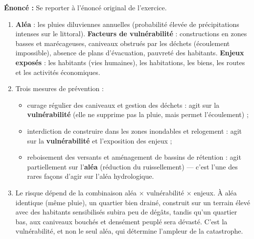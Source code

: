 \documentclass[11pt]{article}
\begin{document}
\begin{corrige}
\textbf{Énoncé :} Se reporter à l'énoncé original de l'exercice.
\tcblower
\begin{enumerate}
\item \textbf{Aléa} : les pluies diluviennes annuelles (probabilité élevée de précipitations intenses sur le littoral). \textbf{Facteurs de vulnérabilité} : constructions en zones basses et marécageuses, caniveaux obstrués par les déchets (écoulement impossible), absence de plans d'évacuation, pauvreté des habitants. \textbf{Enjeux exposés} : les habitants (vies humaines), les habitations, les biens, les routes et les activités économiques.
\item Trois mesures de prévention :
\begin{itemize}
\item curage régulier des caniveaux et gestion des déchets : agit sur la \textbf{vulnérabilité} (elle ne supprime pas la pluie, mais permet l'écoulement) ;
\item interdiction de construire dans les zones inondables et relogement : agit sur la \textbf{vulnérabilité} et l'exposition des enjeux ;
\item reboisement des versants et aménagement de bassins de rétention : agit partiellement sur l'\textbf{aléa} (réduction du ruissellement) — c'est l'une des rares façons d'agir sur l'aléa hydrologique.
\end{itemize}
\item Le risque dépend de la combinaison aléa $\times$ vulnérabilité $\times$ enjeux. À aléa identique (même pluie), un quartier bien drainé, construit sur un terrain élevé avec des habitants sensibilisés subira peu de dégâts, tandis qu'un quartier bas, aux caniveaux bouchés et densément peuplé sera dévasté. C'est la vulnérabilité, et non le seul aléa, qui détermine l'ampleur de la catastrophe.
\end{enumerate}
\end{corrige}
\end{document}
